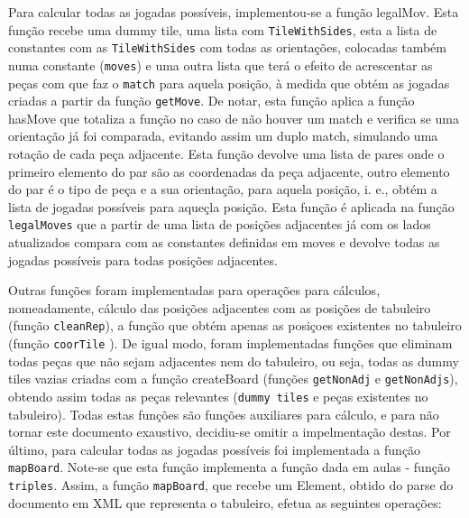 Para calcular todas as jogadas possíveis, implementou-se a função legalMov. Esta função recebe uma dummy
tile, uma lista com \texttt{TileWithSides}, esta a lista de constantes com as \texttt{TileWithSides} com todas as orientações,
colocadas também numa constante (\texttt{moves}) e uma outra lista que terá o efeito de acrescentar as peças
com que faz o \texttt{match} para aquela posição, à medida que obtém as jogadas criadas a partir da função \texttt{getMove}.
De notar, esta função aplica a função hasMove que totaliza a função no caso de não houver um match e
verifica se uma orientação já foi comparada, evitando assim um duplo match, simulando uma rotação de cada
peça adjacente. Esta função devolve uma lista de pares onde o primeiro elemento do par são as coordenadas da peça adjacente, outro
elemento do par é  o tipo de peça e a sua orientação, para aquela posição, i. e., obtém a lista de jogadas
possíveis para aqueçla posição. Esta função é aplicada na função \texttt{legalMoves} que a partir de uma lista de posições adjacentes já com os lados atualizados compara com as
constantes definidas em moves e devolve todas as jogadas possíveis para todas posições adjacentes.

Outras funções  foram implementadas para operações  para cálculos, nomeadamente, cálculo  das posições
adjacentes com  as posições  de tabuleiro  (função \texttt{cleanRep}), a  função que  obtém apenas  as posiçoes
existentes no tabuleiro (função \texttt{coorTile} ). De igual modo, foram implementadas funções que eliminam todas peças que não sejam adjacentes
nem do tabuleiro, ou seja, todas as dummy tiles vazias  criadas com a função createBoard (funções  \texttt{getNonAdj} e
\texttt{getNonAdjs}), obtendo assim todas as peças relevantes (\texttt{dummy tiles} e peças existentes no tabuleiro). Todas
estas funções são funções auxiliares para cálculo, e para não tornar este documento exaustivo, decidiu-se
omitir a impelmentação destas. 
Por último, para calcular todas as jogadas possíveis foi implementada a função \texttt{mapBoard}. Note-se que esta
função implementa a função dada em aulas - função \texttt{triples}. Assim, a função \texttt{mapBoard}, que recebe um Element,
obtido do parse do documento em XML que representa o tabuleiro, efetua as seguintes operações:

